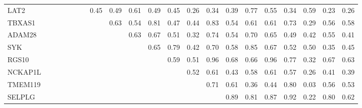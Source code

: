 \begin{longtable}{lrrrrrrrrrrrrrrrrrrrr}
LAT2    &            &              &              &              &             &            &         0.45 &         0.49 &      0.61 &        0.49 &          0.45 &          0.26 &         0.34 &       0.39 &        0.77 &         0.55 &          0.34 &        0.59 &         0.23 &        0.26 \\
TBXAS1  &            &              &              &              &             &            &              &         0.63 &      0.54 &        0.81 &          0.47 &          0.44 &         0.83 &       0.54 &        0.61 &         0.61 &          0.73 &        0.29 &         0.56 &        0.58 \\
ADAM28  &            &              &              &              &             &            &              &              &      0.63 &        0.67 &          0.51 &          0.32 &         0.74 &       0.54 &        0.70 &         0.65 &          0.49 &        0.42 &         0.55 &        0.41 \\
SYK     &            &              &              &              &             &            &              &              &           &        0.65 &          0.79 &          0.42 &         0.70 &       0.58 &        0.85 &         0.67 &          0.52 &        0.50 &         0.35 &        0.45 \\
RGS10   &            &              &              &              &             &            &              &              &           &             &          0.59 &          0.51 &         0.96 &       0.68 &        0.66 &         0.96 &          0.77 &        0.32 &         0.67 &        0.63 \\
NCKAP1L &            &              &              &              &             &            &              &              &           &             &               &          0.52 &         0.61 &       0.43 &        0.58 &         0.61 &          0.57 &        0.26 &         0.41 &        0.39 \\
TMEM119 &            &              &              &              &             &            &              &              &           &             &               &               &         0.71 &       0.61 &        0.36 &         0.44 &          0.80 &        0.03 &         0.56 &        0.53 \\
SELPLG  &            &              &              &              &             &            &              &              &           &             &               &               &              &       0.89 &        0.81 &         0.87 &          0.92 &        0.22 &         0.80 &        0.62 \\

\end{longtable}
